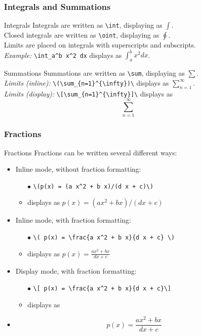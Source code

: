 \begin{frame}[fragile]
\frametitle{Integrals and Summations}
\begin{block}{Integrals}
    Integrals are written as \verb|\int|, displaying as $\int$. \\
    Closed integrals are written as \verb|\oint|, displaying as $\oint$. \\
    Limits are placed on integrals with superscripts and subscripts.\\
    \textit{Example:} \verb|\int_a^b x^2 dx| displays as $\int_a^b x^2 dx$.\\
\end{block}
\begin{block}{Summations}
    Summations are written as \verb|\sum|, displaying as $\sum$. \\
    \textit{Limits (inline):} \verb|\(\sum_{n=1}^{\infty})\| displays as $\sum_{n=1}^{\infty}$.\\
    \textit{Limits (display):} \verb|\[\sum_{n=1}^{\infty}]\| displays as \[\sum_{n=1}^{\infty}\]
\end{block}
\end{frame}


\begin{frame}[fragile]
\frametitle{Fractions}
    \begin{block}{Fractions}
    Fractions can be written several different ways:
    \begin{itemize}
    \item Inline mode, without fraction formatting:
        \begin{itemize}
        \item[$\bullet$] \verb|\(p(x) = (a x^2 + b x)/(d x + c)\)| 
        \item displays as $p(x) = (a x^2 + b x)/(d x + c)$
        \end{itemize}
    \item Inline mode, with fraction formatting:
        \begin{itemize}
        \item[$\bullet$] \verb|\( p(x) = \frac{a x^2 + b x}{d x + c} \)| 
        \item displays as \( p(x) = \frac{a x^2 + b x}{d x + c}\)
        \end{itemize}
    \item Display mode, with fraction formatting:
        \begin{itemize}
        \item[$\bullet$] \verb|\[ p(x) = \frac{a x^2 + b x}{d x + c}\]| 
        \item displays as 
        \end{itemize}
    \item \[ p(x) = \frac{a x^2 + b x}{d x + c}\]
    \end{itemize}
\end{block} 
\end{frame}



